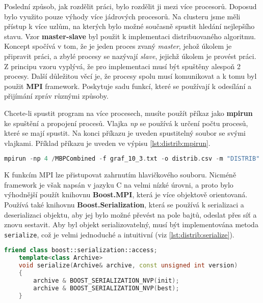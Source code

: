 Poslední způsob, jak rozdělit práci, bylo rozdělit ji mezi více procesorů.
Doposud bylo využito pouze výhody více jádrových procesorů.
Na clusteru jsme měli přístup k více uzlům, na kterých bylo možné současně spustit hledání nejlepšího stavu.
Vzor \textbf{master-slave} byl použit k implementaci distribuovaného algoritmu.
Koncept spočívá v tom, že je jeden proces zvaný \textit{master}, jehož úkolem je připravit práci, a zbylé procesy se nazývají \textit{slave}, jejichž úkolem je provést práci.
Z principu vzoru vyplývá, že pro implementaci musí být spuštěny alespoň 2 procesy.
Další důležitou věcí je, že procesy spolu musí komunikovat a k tomu byl použit \textbf{MPI} framework.
Poskytuje sadu funkcí, které se používají k odesílání a přijímání zpráv různými způsoby.

Chcete-li spustit program na více procesech, musíte použít příkaz jako \textbf{mpirun} ke spuštění a propojení procesů.
Vlajka \textit{np} se používá k určení počtu procesů, které se mají spustit.
Na konci příkazu je uveden spustitelný soubor se svými vlajkami.
Příklad příkazu je uveden ve výpisu \ref{lst:distrib:mpirun}.

\begin{lstlisting}[language=C++, label={lst:distrib:mpirun}, title={Příklad použití příkazu mpirun}]
mpirun -np 4 /MBPCombined -f graf_10_3.txt -o distrib.csv -m "DISTRIB" -dm 4 -ds 4 -t 3
\end{lstlisting}

K funkcím MPI lze přistupovat zahrnutím hlavičkového souboru.
Nicméně framework je však napsán v jazyku C na velmi nízké úrovni, a proto bylo výhodnější použít knihovnu \textbf{Boost.MPI}, která je více objektově orientovaná.
Používá také knihovnu \textbf{Boost.Serialization}, která se používá k serializaci a deserializaci objektu, aby jej bylo možné převést na pole bajtů, odeslat přes síť a znovu sestavit.
Aby byl objekt serializovatelný, musí být implementována metoda \texttt{serialize}, což je velmi jednoduché a intuitivní (viz \ref{lst:distrib:serialize}).

\begin{lstlisting}[language=C++, label={lst:distrib:serialize}, title={Příklad implementace metody serialize}]
    friend class boost::serialization::access;
    template<class Archive>
    void serialize(Archive& archive, const unsigned int version)
    {
        archive & BOOST_SERIALIZATION_NVP(init);
        archive & BOOST_SERIALIZATION_NVP(best);
    }
\end{lstlisting}

